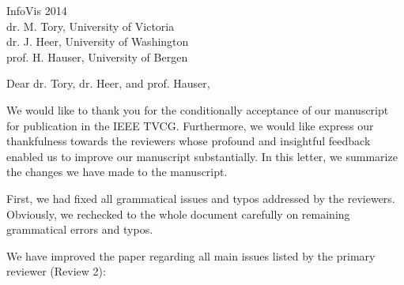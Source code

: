 \documentclass{letter}
\begin{document}
\begin{letter}{InfoVis 2014 \\ dr. M. Tory, University of Victoria \\ dr. J. Heer, University of Washington \\ prof. H. Hauser, University of Bergen}
\opening{Dear dr. Tory, dr. Heer, and prof. Hauser,}

We would like to thank you for the conditionally acceptance of our manuscript for publication in the IEEE TVCG. Furthermore, we would like express our thankfulness towards the reviewers whose profound and insightful feedback enabled us to improve our manuscript substantially. In this letter, we summarize the changes we have made to the manuscript.


First, we had fixed all grammatical issues and typos addressed by the reviewers. Obviously, we rechecked to the whole document carefully on remaining grammatical errors and typos.

We have improved the paper regarding all main issues listed by the primary reviewer (Review 2):


\end{letter}
\end{document}
